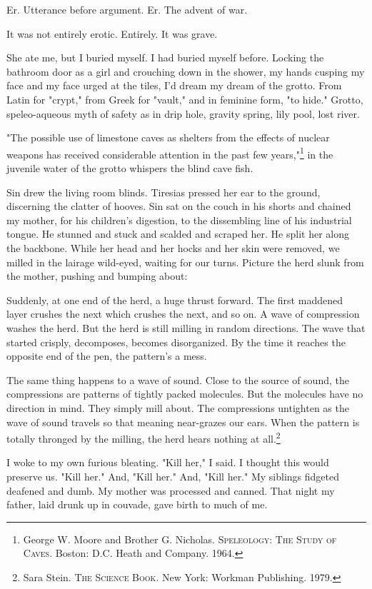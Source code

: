 \documentclass[
]{memoir}
\begin{document}
Er. Utterance before argument. Er. The advent of war.

It was not entirely erotic. Entirely. It was grave.

She ate me, but I buried myself. I had buried myself before. Locking the
bathroom door as a girl and crouching down in the shower, my hands
cusping my face and my face urged at the tiles, I'd dream my dream of
the grotto. From Latin for "crypt," from Greek for "vault," and in
feminine form, "to hide." Grotto, speleo-aqueous myth of safety as in
drip hole, gravity spring, lily pool, lost river.

"The possible use of limestone caves as shelters from the effects of
nuclear weapons has received considerable attention in the past few
years,"\footnote{George W. Moore and Brother G. Nicholas.
  \textsc{Speleology: The Study of Caves}. Boston: D.C. Heath and
  Company. 1964.} in the juvenile water of the grotto whispers the blind
cave fish.

Sin drew the living room blinds. Tiresias pressed her ear to the ground,
discerning the clatter of hooves. Sin sat on the couch in his shorts and
chained my mother, for his children's digestion, to the dissembling line
of his industrial tongue. He stunned and stuck and scalded and scraped
her. He split her along the backbone. While her head and her hocks and
her skin were removed, we milled in the lairage wild-eyed, waiting for
our turns. Picture the herd slunk from the mother, pushing and bumping
about:

Suddenly, at one end of the herd, a huge thrust forward. The first
maddened layer crushes the next which crushes the next, and so on. A
wave of compression washes the herd. But the herd is still milling in
random directions. The wave that started crisply, decomposes, becomes
disorganized. By the time it reaches the opposite end of the pen, the
pattern's a mess.

The same thing happens to a wave of sound. Close to the source of sound,
the compressions are patterns of tightly packed molecules. But the
molecules have no direction in mind. They simply mill about. The
compressions untighten as the wave of sound travels so that meaning
near-grazes our ears. When the pattern is totally thronged by the
milling, the herd hears nothing at all.\footnote{Sara Stein. \textsc{The
  Science Book}. New York: Workman Publishing. 1979.}

I woke to my own furious bleating. "Kill her," I said. I thought this
would preserve us. "Kill her." And, "Kill her." And, "Kill her." My
siblings fidgeted deafened and dumb. My mother was processed and canned.
That night my father, laid drunk up in couvade, gave birth to much of
me.
\end{document}
